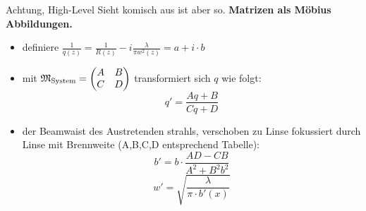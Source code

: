 \documentclass[10pt, aspectratio=169]{beamer}
\begin{document}
\begin{frame}
  \begin{alertblock}{Achtung, High-Level}
    Sieht komisch aus ist aber so. \textbf{Matrizen als
      M\"obius Abbildungen.}
  \end{alertblock}

  \begin{itemize}
  \item<2-> definiere
    \(\frac{1}{q(z)}=\frac{1}{R(z)}-i\frac{\lambda}{\pi
      w^2(z)}=a+i\cdot b\) 
  \item<3-> mit
    \(\mathfrak{M}_{\text{System}} = \mqty(A & B \\ C & D)\)
    transformiert sich \(q\) wie folgt:
    \begin{equation}
      \label{eq:qtrans}
      q'=\frac{Aq + B}{Cq+D}
    \end{equation}

    \item<4-> der Beamwaist des Austretenden strahls, verschoben zu Linse
      fokussiert durch Linse mit Brennweite (A,B,C,D entsprechend
      Tabelle):
      \begin{equation}
        \label{eq:qkaust}
        b'=b\cdot\frac{AD-CB}{A^2+B^2b^2}
      \end{equation}
      \begin{equation}
        \label{eq:reswaist}
        w'=\sqrt{\frac{\lambda}{\pi\cdot b'(x)}}
      \end{equation}
  \end{itemize}
\end{frame}
\end{document}
